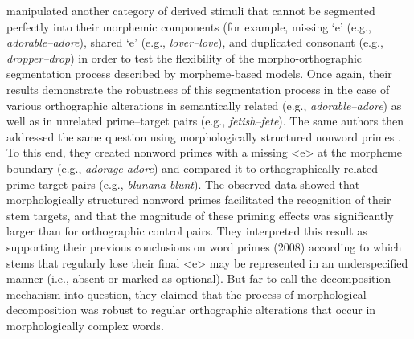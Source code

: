\documentclass[output=paper]{langsci/langscibook}
\begin{document}
%
\citet{McCormickRastleEtAl2008} %
%
manipulated another category of
derived stimuli that cannot be segmented perfectly into their morphemic
components (for example, missing `e' (e.g., \emph{adorable--adore}), 
shared `e' (e.g., \emph{lover--love}), and  duplicated consonant
(e.g., \emph{dropper--drop}) in order to test the flexibility of the
morpho-orthographic segmentation process described by morpheme-based
models. Once again, their results demonstrate the robustness of this
segmentation process in the case of various orthographic alterations in
semantically related (e.g., \emph{adorable--adore}) as well as in
unrelated prime--target pairs (e.g., \emph{fetish--fete}). The same
authors then addressed the same question using morphologically
structured nonword primes %
\citep{McCormickRastleEtAl2009}%
%
%
. To this end, they
created nonword primes with a missing <e> at the morpheme boundary
(e.g., \emph{adorage-adore}) and compared it to orthographically related
prime-target pairs (e.g., \emph{blunana-blunt}). The observed data
showed that morphologically structured nonword primes facilitated the
recognition of their stem targets, and that the magnitude of these
priming effects was significantly larger than for orthographic control
pairs. They interpreted this result as supporting their previous
conclusions on word primes (2008) according to which stems that
regularly lose their final <e> may be represented in an
underspecified manner (i.e., absent or marked as optional). But far to
call the decomposition mechanism into question, they claimed that the
process of morphological decomposition was robust to regular
orthographic alterations that occur in morphologically complex words.
\end{document}
